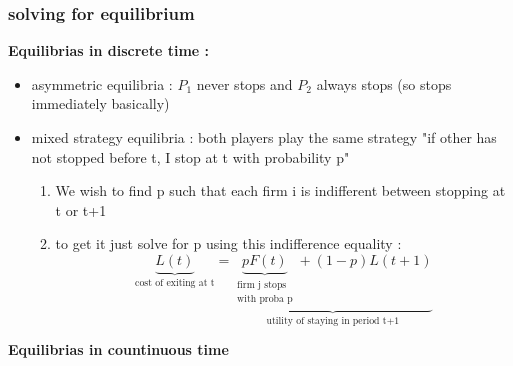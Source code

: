 \documentclass{article}
\begin{document}
\subsubsection{solving for equilibrium}
\textbf{Equilibrias in discrete time : }
\begin{itemize}
    \item asymmetric equilibria : $P_1$ never stops and $P_2$ always stops (so stops immediately basically)
    \item mixed strategy equilibria : both players play the same strategy "if other has not stopped before t, I stop at t with probability p"
    \begin{enumerate}
        \item We wish to find p such that each firm i is indifferent between stopping at t or t+1
        \item to get it just solve for p using this indifference equality : 
        \begin{equation}
            \underbrace{L(t)}_{\text{cost of exiting at t}} = \underbrace{\underbrace{pF(t)}_{\substack{\text{firm j stops}\\\text{with proba p}}}+(1-p)L(t+1)}_{\text{utility of staying in period t+1}}
        \end{equation}
    \end{enumerate}
\end{itemize}
\textbf{Equilibrias in countinuous time}
\end{document}

